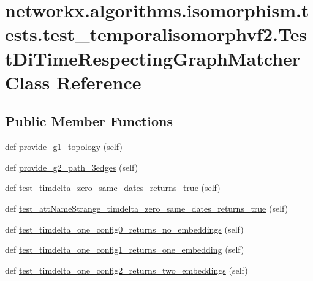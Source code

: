 \hypertarget{classnetworkx_1_1algorithms_1_1isomorphism_1_1tests_1_1test__temporalisomorphvf2_1_1TestDiTimeRespectingGraphMatcher}{}\section{networkx.\+algorithms.\+isomorphism.\+tests.\+test\+\_\+temporalisomorphvf2.\+Test\+Di\+Time\+Respecting\+Graph\+Matcher Class Reference}
\label{classnetworkx_1_1algorithms_1_1isomorphism_1_1tests_1_1test__temporalisomorphvf2_1_1TestDiTimeRespectingGraphMatcher}
\subsection*{Public Member Functions}
\begin{DoxyCompactItemize}
\item 
def \hyperlink{classnetworkx_1_1algorithms_1_1isomorphism_1_1tests_1_1test__temporalisomorphvf2_1_1TestDiTimeRespectingGraphMatcher_a6998f5ca4d8020f2ba340bc309d6ff56}{provide\+\_\+g1\+\_\+topology} (self)
\item 
def \hyperlink{classnetworkx_1_1algorithms_1_1isomorphism_1_1tests_1_1test__temporalisomorphvf2_1_1TestDiTimeRespectingGraphMatcher_aae148b1ce941e0ea3f365a53c2da5524}{provide\+\_\+g2\+\_\+path\+\_\+3edges} (self)
\item 
def \hyperlink{classnetworkx_1_1algorithms_1_1isomorphism_1_1tests_1_1test__temporalisomorphvf2_1_1TestDiTimeRespectingGraphMatcher_adc1ec541e08c3ec193a3a736d2314b11}{test\+\_\+timdelta\+\_\+zero\+\_\+same\+\_\+dates\+\_\+returns\+\_\+true} (self)
\item 
def \hyperlink{classnetworkx_1_1algorithms_1_1isomorphism_1_1tests_1_1test__temporalisomorphvf2_1_1TestDiTimeRespectingGraphMatcher_afc7863567d1e08eaf512e40ddfe9d60b}{test\+\_\+att\+Name\+Strange\+\_\+timdelta\+\_\+zero\+\_\+same\+\_\+dates\+\_\+returns\+\_\+true} (self)
\item 
def \hyperlink{classnetworkx_1_1algorithms_1_1isomorphism_1_1tests_1_1test__temporalisomorphvf2_1_1TestDiTimeRespectingGraphMatcher_a1340062906acb7ec27ee4ba5f90e1ffd}{test\+\_\+timdelta\+\_\+one\+\_\+config0\+\_\+returns\+\_\+no\+\_\+embeddings} (self)
\item 
def \hyperlink{classnetworkx_1_1algorithms_1_1isomorphism_1_1tests_1_1test__temporalisomorphvf2_1_1TestDiTimeRespectingGraphMatcher_aa69dd68a4f38812de291dd7fb6767bb8}{test\+\_\+timdelta\+\_\+one\+\_\+config1\+\_\+returns\+\_\+one\+\_\+embedding} (self)
\item 
def \hyperlink{classnetworkx_1_1algorithms_1_1isomorphism_1_1tests_1_1test__temporalisomorphvf2_1_1TestDiTimeRespectingGraphMatcher_a420bb9e240f9df5628e21064f74a9692}{test\+\_\+timdelta\+\_\+one\+\_\+config2\+\_\+returns\+\_\+two\+\_\+embeddings} (self)
\end{DoxyCompactItemize}


